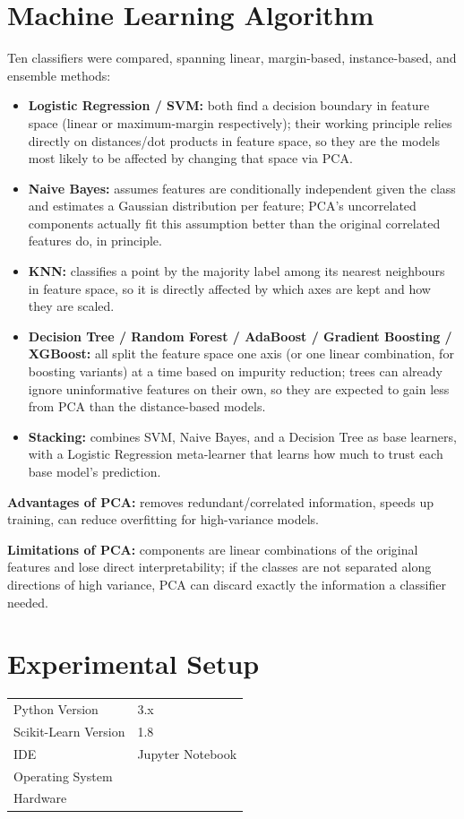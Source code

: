 \documentclass[12pt,a4paper]{article}
\begin{document}
\section{Machine Learning Algorithm}
Ten classifiers were compared, spanning linear, margin-based, instance-based, and ensemble methods:

\begin{itemize}
\item \textbf{Logistic Regression / SVM:} both find a decision boundary in feature space (linear
or maximum-margin respectively); their working principle relies directly on distances/dot products
in feature space, so they are the models most likely to be affected by changing that space via PCA.
\item \textbf{Naive Bayes:} assumes features are conditionally independent given the class and
estimates a Gaussian distribution per feature; PCA's uncorrelated components actually fit this
assumption better than the original correlated features do, in principle.
\item \textbf{KNN:} classifies a point by the majority label among its nearest neighbours in
feature space, so it is directly affected by which axes are kept and how they are scaled.
\item \textbf{Decision Tree / Random Forest / AdaBoost / Gradient Boosting / XGBoost:} all split
the feature space one axis (or one linear combination, for boosting variants) at a time based on
impurity reduction; trees can already ignore uninformative features on their own, so they are
expected to gain less from PCA than the distance-based models.
\item \textbf{Stacking:} combines SVM, Naive Bayes, and a Decision Tree as base learners, with a
Logistic Regression meta-learner that learns how much to trust each base model's prediction.
\end{itemize}

\textbf{Advantages of PCA:} removes redundant/correlated information, speeds up training, can
reduce overfitting for high-variance models.

\textbf{Limitations of PCA:} components are linear combinations of the original features and lose
direct interpretability; if the classes are not separated along directions of high variance, PCA
can discard exactly the information a classifier needed.

\section{Experimental Setup}
\begin{tabular}{ll}
\toprule
Python Version & 3.x \\
Scikit-Learn Version & 1.8 \\
IDE & Jupyter Notebook \\
Operating System & \\
Hardware & \\
\bottomrule
\end{tabular}
\end{document}
